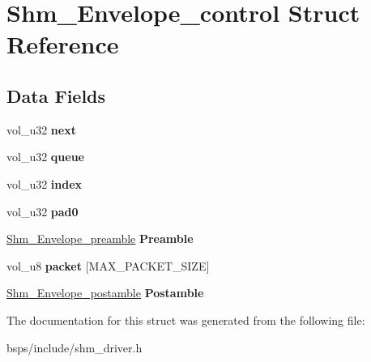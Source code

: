 \hypertarget{structShm__Envelope__control}{}\section{Shm\+\_\+\+Envelope\+\_\+control Struct Reference}
\label{structShm__Envelope__control}
\subsection*{Data Fields}
\begin{DoxyCompactItemize}
\item 
\mbox{\label{structShm__Envelope__control_a0f838bd61634f396784d5e0f2ae9f86e}} 
vol\+\_\+u32 {\bfseries next}
\item 
\mbox{\label{structShm__Envelope__control_a85819b635b27ad4ee0459286761f1f2c}} 
vol\+\_\+u32 {\bfseries queue}
\item 
\mbox{\label{structShm__Envelope__control_a260cd5c35200f1e339e584a1026b6cd9}} 
vol\+\_\+u32 {\bfseries index}
\item 
\mbox{\label{structShm__Envelope__control_a38a19ba65ae5048a1a807f715ceec9f9}} 
vol\+\_\+u32 {\bfseries pad0}
\item 
\mbox{\label{structShm__Envelope__control_aa2a0bfdd1b9641c6ccb148c95c993dc4}} 
\mbox{\hyperlink{structShm__Envelope__preamble}{Shm\+\_\+\+Envelope\+\_\+preamble}} {\bfseries Preamble}
\item 
\mbox{\label{structShm__Envelope__control_a06fc48f31958da1cf10ec860eb2a6a81}} 
vol\+\_\+u8 {\bfseries packet} \mbox{[}M\+A\+X\+\_\+\+P\+A\+C\+K\+E\+T\+\_\+\+S\+I\+ZE\mbox{]}
\item 
\mbox{\label{structShm__Envelope__control_ac0b0114da18d36847b76371fd163ff92}} 
\mbox{\hyperlink{structShm__Envelope__postamble}{Shm\+\_\+\+Envelope\+\_\+postamble}} {\bfseries Postamble}
\end{DoxyCompactItemize}


The documentation for this struct was generated from the following file\+:\begin{DoxyCompactItemize}
\item 
bsps/include/shm\+\_\+driver.\+h\end{DoxyCompactItemize}

